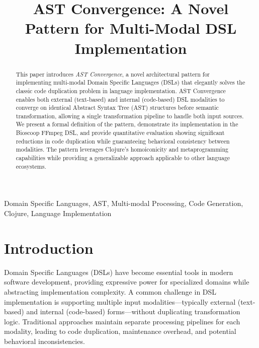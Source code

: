 \documentclass[conference]{IEEEtran}
\begin{document}
\title{AST Convergence: A Novel Pattern for Multi-Modal DSL Implementation}

\author{
}

\maketitle

\begin{abstract}
This paper introduces \emph{AST Convergence}, a novel architectural pattern for implementing multi-modal Domain Specific Languages (DSLs) that elegantly solves the classic code duplication problem in language implementation. AST Convergence enables both external (text-based) and internal (code-based) DSL modalities to converge on identical Abstract Syntax Tree (AST) structures before semantic transformation, allowing a single transformation pipeline to handle both input sources. We present a formal definition of the pattern, demonstrate its implementation in the Bioscoop FFmpeg DSL, and provide quantitative evaluation showing significant reductions in code duplication while guaranteeing behavioral consistency between modalities. The pattern leverages Clojure's homoiconicity and metaprogramming capabilities while providing a generalizable approach applicable to other language ecosystems.
\end{abstract}

\begin{IEEEkeywords}
Domain Specific Languages, AST, Multi-modal Processing, Code Generation, Clojure, Language Implementation
\end{IEEEkeywords}

\section{Introduction}

Domain Specific Languages (DSLs) have become essential tools in modern software development, providing expressive power for specialized domains while abstracting implementation complexity. A common challenge in DSL implementation is supporting multiple input modalities---typically external (text-based) and internal (code-based) forms---without duplicating transformation logic. Traditional approaches maintain separate processing pipelines for each modality, leading to code duplication, maintenance overhead, and potential behavioral inconsistencies.
\end{document}
